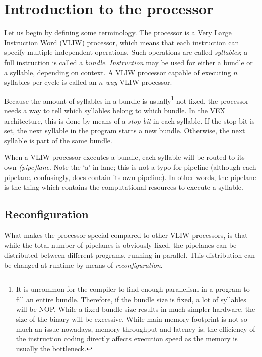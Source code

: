 
\clearpage
\section{Introduction to the \rvex{} processor}
\label{sec:core-ug-intro}

Let us begin by defining some terminology. The \rvex{} processor is a Very Large 
Instruction Word (VLIW) processor, which means that each instruction can specify 
multiple independent operations. Such operations are called \textit{syllables}; 
a full instruction is called a \textit{bundle}. \textit{Instruction} may be used 
for either a bundle or a syllable, depending on context. A VLIW processor 
capable of executing $n$ syllables per cycle is called an $n$\textit{-way} VLIW 
processor.

Because the amount of syllables in a bundle is usually\footnote{It is uncommon 
for the compiler to find enough parallelism in a program to fill an entire 
bundle. Therefore, if the bundle size is fixed, a lot of syllables will be NOP. 
While a fixed bundle size results in much simpler hardware, the size of the 
binary will be excessive. While main memory footprint is not so much an issue 
nowadays, memory throughput and latency is; the efficiency of the instruction 
coding directly affects execution speed as the memory is usually the 
bottleneck.} not fixed, the processor needs a way to tell which syllables belong 
to which bundle. In the VEX architecture, this is done by means of a 
\textit{stop bit} in each syllable. If the stop bit is set, the next syllable in 
the program starts a new bundle. Otherwise, the next syllable is part of the 
same bundle.

When a VLIW processor executes a bundle, each syllable will be routed to its own 
\textit{(pipe)lane}. Note the `a' in lane; this is not a typo for pipeline 
(although each pipelane, confusingly, does contain its own pipeline). In other 
words, the pipelane is the thing which contains the computational resources to 
execute a syllable.

\subsection{Reconfiguration}
\label{sec:core-ug-intro-reconf}

What makes the \rvex{} processor special compared to other VLIW processors, is 
that while the total number of pipelanes is obviously fixed, the pipelanes can 
be distributed between different programs, running in parallel. This 
distribution can be changed at runtime by means of \textit{reconfiguration}.

